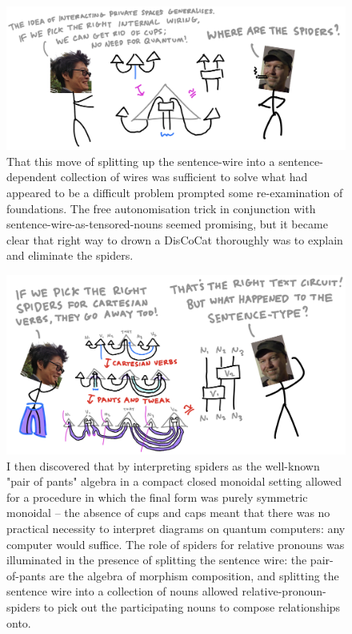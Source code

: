 \begin{figure}[h!]
\includegraphics{figures/cartoons/circify2}
\caption{That this move of splitting up the sentence-wire into a sentence-dependent collection of wires was sufficient to solve what had appeared to be a difficult problem prompted some re-examination of foundations. The free autonomisation trick in conjunction with sentence-wire-as-tensored-nouns seemed promising, but it became clear that right way to drown a DisCoCat thoroughly was to explain and eliminate the spiders.}
\end{figure}

\begin{figure}[h!]
\includegraphics{figures/cartoons/circify3}
\caption{I then discovered that by interpreting spiders as the well-known "pair of pants" algebra in a compact closed monoidal setting allowed for a procedure in which the final form was purely symmetric monoidal -- the absence of cups and caps meant that there was no practical necessity to interpret diagrams on quantum computers: any computer would suffice. The role of spiders for relative pronouns was illuminated in the presence of splitting the sentence wire: the pair-of-pants are the algebra of morphism composition, and splitting the sentence wire into a collection of nouns allowed relative-pronoun-spiders to pick out the participating nouns to compose relationships onto.}
\end{figure}

